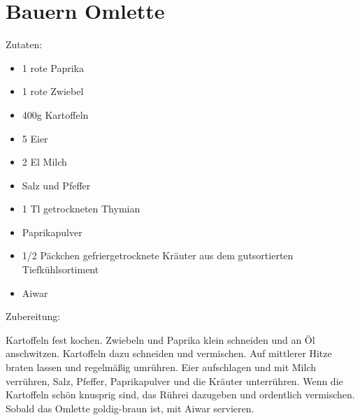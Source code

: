 \section{Bauern Omlette}
Zutaten:
\begin{itemize}
    \item 1 rote Paprika
    \item 1 rote Zwiebel
    \item 400g Kartoffeln
    \item 5 Eier
    \item 2 El Milch
    \item Salz und Pfeffer
    \item 1 Tl getrockneten Thymian
    \item Paprikapulver
	\item 1/2 Päckchen gefriergetrocknete Kräuter aus dem gutsortierten
		Tiefkühlsortiment
    \item Aiwar
\end{itemize}

\noindent Zubereitung:

\noindent Kartoffeln fest kochen. Zwiebeln und Paprika klein schneiden und an
Öl anschwitzen. Kartoffeln dazu schneiden und vermischen. Auf mittlerer Hitze
braten lassen und regelmäßig umrühren. Eier aufschlagen und mit Milch
verrühren, Salz, Pfeffer, Paprikapulver und die Kräuter unterrühren. Wenn die
Kartoffeln schön knusprig sind, das Rührei dazugeben und ordentlich vermischen.
Sobald das Omlette goldig-braun ist, mit Aiwar servieren.

\newpage
\mbox{}
\vfill
\begin{center}
\end{center}
\vfill
\mbox{ }
\newpage
